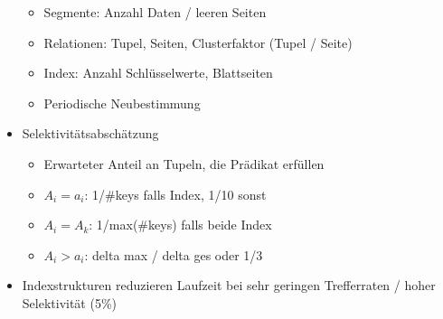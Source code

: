 \documentclass[11pt, paper=a4, twocolumn]{scrartcl}
\begin{document}
\begin{itemize}
\begin{itemize}
					\item Segmente: Anzahl Daten / leeren Seiten
					\item Relationen: Tupel, Seiten, Clusterfaktor 
						(Tupel / Seite)
					\item Index: Anzahl Schlüsselwerte, Blattseiten
					\item Periodische Neubestimmung
				\end{itemize}
			\item Selektivitätsabschätzung
				\begin{itemize}
					\item Erwarteter Anteil an Tupeln, die Prädikat 
						erfüllen
					\item $A_i=a_i$: 1/\#keys falls Index, 1/10 sonst
					\item $A_i=A_k$: 1/max(\#keys) falls beide Index
					\item $A_i>a_i$: delta max / delta ges oder 1/3
				\end{itemize}
			\item Indexstrukturen reduzieren Laufzeit bei sehr geringen 
				Trefferraten / hoher Selektivität (5\%)
		\end{itemize}
	
\end{document}
